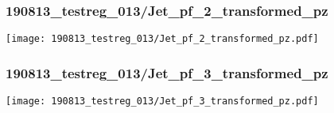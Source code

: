 \begin{frame}
   \frametitle{\small 190813\_testreg\_013/Jet\_pf\_2\_transformed\_pz}
   \centering
   \texttt{[image: 190813\_testreg\_013/Jet\_pf\_2\_transformed\_pz.pdf]}
\end{frame}

\begin{frame}
   \frametitle{\small 190813\_testreg\_013/Jet\_pf\_3\_transformed\_pz}
   \centering
   \texttt{[image: 190813\_testreg\_013/Jet\_pf\_3\_transformed\_pz.pdf]}
\end{frame}

